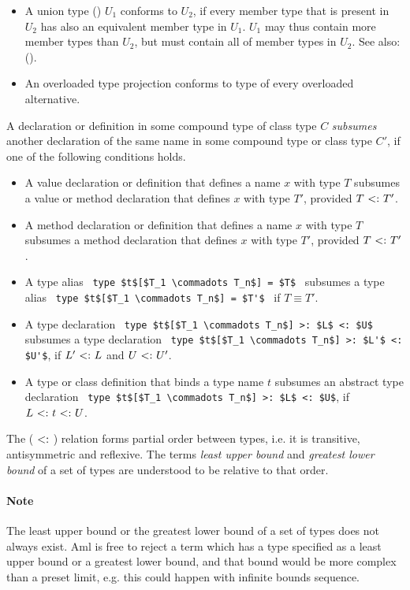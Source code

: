 \begin{itemize}
  \item A union type () $U_1$ conforms to $U_2$, if every member type that is present in $U_2$ has also an equivalent member type in $U_1$. $U_1$ may thus contain more member types than $U_2$, but must contain all of member types in $U_2$. See also: ().

  \item An overloaded type projection conforms to type of every overloaded alternative. 
\end{itemize}

A declaration or definition in some compound type of class type $C$ {\em subsumes} another declaration of the same name in some compound type or class type $C'$, if one of the following conditions holds. 
\begin{itemize}
  \item A value declaration or definition that defines a name $x$ with type $T$ subsumes a value or method declaration that defines $x$ with type $T'$, provided $T \conforms T'$. 
  \item A method declaration or definition that defines a name $x$ with type $T$ subsumes a method declaration that defines $x$ with type $T'$, provided $T \conforms T'$. 
  \item A type alias ~\lstinline!type $t$[$T_1 \commadots T_n$] = $T$!~ subsumes a type alias ~\lstinline!type $t$[$T_1 \commadots T_n$] = $T'$!~ if $T \equiv T'$. 
  \item A type declaration ~\lstinline!type $t$[$T_1 \commadots T_n$] >: $L$ <: $U$!~ subsumes a type declaration ~\lstinline!type $t$[$T_1 \commadots T_n$] >: $L'$ <: $U'$!, if $L' \conforms L$ and $U \conforms U'$. 
  \item A type or class definition that binds a type name $t$ subsumes an abstract type declaration ~\lstinline!type $t$[$T_1 \commadots T_n$] >: $L$ <: $U$!, if $L \conforms t \conforms U$. 
\end{itemize}

The ($\conforms$) relation forms partial order between types, i.e. it is transitive, antisymmetric and reflexive. The terms {\em least upper bound} and {\em greatest lower bound} of a set of types are understood to be relative to that order. 

\paragraph{Note}
The least upper bound or the greatest lower bound of a set of types does not always exist. Aml is free to reject a term which has a type specified as a least upper bound or a greatest lower bound, and that bound would be more complex than a preset limit, e.g. this could happen with infinite bounds sequence. 

